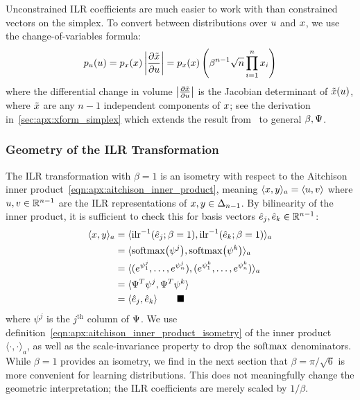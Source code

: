 Unconstrained \gls*{ILR} coefficients are much easier to work with than constrained vectors on the simplex.
To convert between distributions over $u$ and $x$, we use the change-of-variables formula:
\begin{align}\label{eqn:apx:ilr_density}
    p_{u}(u)
    = p_{x}(x) \left| \frac{\partial \tilde{x}}{\partial u} \right|
    = p_{x}(x) \left( \beta^{n-1} \sqrt{n} \prod_{i=1}^{n} x_{i} \right)
\end{align}
where the differential change in volume $\left| \frac{\partial \tilde{x}}{\partial u} \right|$ is the Jacobian determinant of $\tilde{x}(u)$, where $\tilde{x}$ are any $n-1$ independent components of $x$;
see the derivation in~\cref{sec:apx:xform_simplex} which extends the result from~\citep{figueras_distributions_2003} to general $\beta, \Psi$.

\subsubsection{Geometry of the \gls*{ILR} Transformation}\label{sec:apx:ilr_geometry}

The \gls*{ILR} transformation with $\beta = 1$ is an isometry with respect to the Aitchison inner product~\eqref{eqn:apx:aitchison_inner_product}, meaning $\langle x, y \rangle_{a} = \langle u, v \rangle$ where $u, v \in \mathbb{R}^{n-1}$ are the \gls*{ILR} representations of $x, y \in \Delta_{n-1}$.
By bilinearity of the inner product, it is sufficient to check this for basis vectors $\hat{e}_j, \hat{e}_k \in \mathbb{R}^{n-1}$:
\begin{align*}
    \langle \vv{x}, \vv{y} \rangle_{a} & = \langle \InvILR{\vv{\hat{e}}_j; \beta = 1}, \InvILR{\vv{\hat{e}}_k; \beta = 1} \rangle_{a}                     \\
                                       & = \langle \Softmax{\psi^{j}}, \Softmax{\psi^{k}} \rangle_{a}                                                     \\
                                       & = \langle (e^{\psi^{j}_{1}}, \ldots, e^{\psi^{j}_{n}}), (e^{\psi^{k}_{1}}, \ldots, e^{\psi^{k}_{n}}) \rangle_{a} \\
                                       & = \langle \Psi^T \psi^{j}, \Psi^T \psi^{k} \rangle                                                               \\
                                       & = \langle \vv{\hat{e}}_j, \vv{\hat{e}}_k \rangle \tag*{$\blacksquare$}
\end{align*}
where $\psi^{j}$ is the $j^{\text{th}}$ column of $\Psi$.
We use definition~\eqref{eqn:apx:aitchison_inner_product_isometry} of the inner product $\langle \cdot, \cdot \rangle_{a}$, as well as the scale-invariance property to drop the $\operatorname{softmax}$ denominators.
While $\beta = 1$ provides an isometry, we find in the next section that $\beta = \pi / \sqrt{6}$ is more convenient for learning distributions.
This does not meaningfully change the geometric interpretation;
the \gls*{ILR} coefficients are merely scaled by $1/\beta$.


